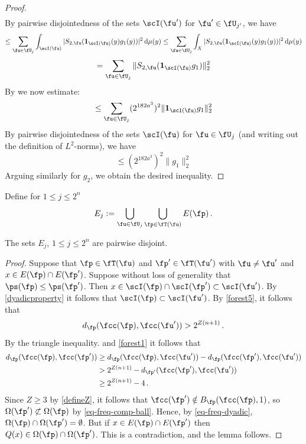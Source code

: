 \begin{proof}
\begin{multline*}
    \end{multline*}
    By pairwise disjointedness of the sets $\scI(\fu')$ for $\fu' \in \fU_{j'}$, we have
    $$
        \le \sum_{\fu \in \fU_j}\int_{\scI(\fu)} |S_{2,\fu} (\mathbf{1}_{\scI(\fu)}(y)g_1(y))|^2 \, \mathrm{d}\mu(y)
        \le \sum_{\fu \in \fU_j}\int_{X} |S_{2,\fu} (\mathbf{1}_{\scI(\fu)}(y)g_1(y))|^2 \, \mathrm{d}\mu(y)
    $$
    $$
       = \sum_{\fu \in \fU_j}\|S_{2,\fu} (\mathbf{1}_{\scI(\fu)}g_1)\|_2^2
    $$
    By  we now estimate:
    $$
        \le \sum_{\fu \in \fU_j}(2^{182a^3})^2 \|\mathbf{1}_{\scI(\fu)}g_1\|_2^2
    $$
    By pairwise disjointedness of the sets $\scI(\fu)$ for $\fu \in \fU_j$ (and writing out the definition of $L^2$-norms), we have
    $$
        \le (2^{182a^3})^2 \|g_1\|_2^2
    $$
    Arguing similarly for $g_2$, we obtain the desired inequality.
\end{proof}

Define for $1 \le j \le 2^n$
$$
    E_j := \bigcup_{\fu \in \fU_j} \bigcup_{\fp \in \fT(\fu)} E(\fp)\,.
$$

\begin{lemma}
    \label{disjoint-row-support}
    \leanok
    The sets $E_j$, $1 \le j \le 2^n$ are pairwise disjoint.
\end{lemma}

\begin{proof}
    \leanok
    Suppose that $\fp \in \fT(\fu)$ and $\fp' \in \fT(\fu')$ with $\fu \ne \fu'$ and $x \in E(\fp) \cap E(\fp')$. Suppose without loss of generality that $\ps(\fp) \le \ps(\fp')$. Then $x \in \scI(\fp) \cap \scI(\fp') \subset \scI(\fu')$. By \eqref{dyadicproperty} it follows that $\scI(\fp) \subset \scI(\fu')$. By \eqref{forest5}, it follows that
    $$
        d_{\fp}(\fcc(\fp), \fcc(\fu')) > 2^{Z(n+1)}\,.
    $$
    By the triangle inequality.  and \eqref{forest1} it follows that
    \begin{align*}
        d_{\fp}(\fcc(\fp), \fcc(\fp')) &\ge d_{\fp}(\fcc(\fp), \fcc(\fu')) - d_{\fp}(\fcc(\fp'), \fcc(\fu'))\\
        &> 2^{Z(n+1)} - d_{\fp'}(\fcc(\fp'), \fcc(\fu'))\\
        &\ge 2^{Z(n+1)} - 4\,.
    \end{align*}
    Since $Z \ge 3$ by \eqref{defineZ}, it follows that $\fcc(\fp') \notin B_{\fp}(\fcc(\fp), 1)$, so $\Omega(\fp') \not\subset \Omega(\fp)$ by \eqref{eq-freq-comp-ball}. Hence, by \eqref{eq-freq-dyadic}, $\Omega(\fp) \cap \Omega(\fp') = \emptyset$. But if $x \in E(\fp) \cap E(\fp')$ then $Q(x) \in \Omega(\fp) \cap \Omega(\fp')$. This is a contradiction, and the lemma follows.
\end{proof}


